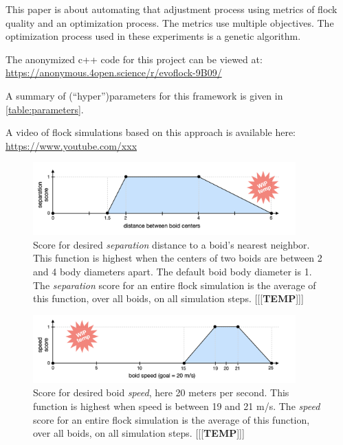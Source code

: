 \documentclass[letterpaper]{article}
\begin{document}
This paper is about automating that adjustment process using metrics of flock quality and an optimization process. The metrics use multiple objectives. The optimization process used in these experiments is a genetic algorithm.

The anonymized c++ code for this project can be viewed at:
\scriptsize
\url{https://anonymous.4open.science/r/evoflock-9B09/}
\normalsize

A summary of (``hyper'')parameters for this framework is given in \ref{table:parameters}.

A video of flock simulations based on this approach is available here:
\scriptsize
\url{https://www.youtube.com/xxx}
\normalsize



\begin{figure}[t]
    \centering
    \includegraphics[width=0.9\textwidth]{images/temp_sep_score.png}
    \caption{Score for desired \textit{separation} distance to a boid's nearest neighbor. This function is highest when the centers of two boids are between 2 and 4 body diameters apart. The default boid body diameter is 1. The \textit{separation} score for an entire flock simulation is the average of this function, over all boids, on all simulation steps. [[[\textbf{TEMP}]]]}
    \label{fig:SeparationScore}
\end{figure}

\begin{figure}[t]
    \centering
    \includegraphics[width=0.9\textwidth]{images/temp_speed_score.png}
    \caption{Score for desired boid \textit{speed}, here 20 meters per second. This function is highest when speed is between 19 and 21 m/s. The \textit{speed} score for an entire flock simulation is the average of this function, over all boids, on all simulation steps. [[[\textbf{TEMP}]]]}
    \label{fig:speed_score}
\end{figure}
\end{document}
